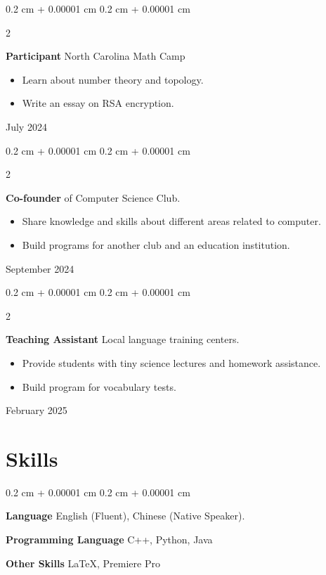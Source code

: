 \documentclass[10pt, letterpaper]{article}
\newenvironment{highlights}{
    \begin{itemize}[
        topsep=0.10 cm,
        parsep=0.10 cm,
        partopsep=0pt,
        itemsep=0pt,
        leftmargin=0.4 cm + 10pt
    ]
}{
    \end{itemize}
} %
\newenvironment{onecolentry}{
    \begin{adjustwidth}{
        0.2 cm + 0.00001 cm
    }{
        0.2 cm + 0.00001 cm
    }
}{
    \end{adjustwidth}
} %
\newenvironment{twocolentry}[2][]{
    \onecolentry
    \def\secondColumn{#2}
    \setcolumnwidth{\fill, 4.5 cm}
    \begin{paracol}{2}
}{
    \switchcolumn \raggedleft \secondColumn
    \end{paracol}
    \endonecolentry
} %
\begin{document}
        \begin{twocolentry}{ July 2024 }
            \textbf{Participant} North Carolina Math Camp

            \begin{highlights}
                \item Learn about number theory and topology.
                \item Write an essay on RSA encryption.
            \end{highlights}
        \end{twocolentry}

        \begin{twocolentry}{ September 2024 }
            \textbf{Co-founder} of Computer Science Club.

            \begin{highlights}
                \item Share knowledge and skills about different areas related to computer.
                \item Build programs for another club and an education institution.
            \end{highlights}
        \end{twocolentry}

        \begin{twocolentry}{ February 2025 }
            \textbf{Teaching Assistant} Local language training centers.

            \begin{highlights}
                \item Provide students with tiny science lectures and homework assistance.
                \item Build program for vocabulary tests.
            \end{highlights}
        \end{twocolentry}
    \section{Skills}

    \begin{onecolentry}

        \textbf{Language}  English (Fluent), Chinese (Native Speaker).

        \vspace{5pt}

        \textbf{Programming Language} C++, Python, Java

        \vspace{5pt}

        \textbf{Other Skills} \LaTeX, Premiere Pro
    \end{onecolentry}
\end{document}
